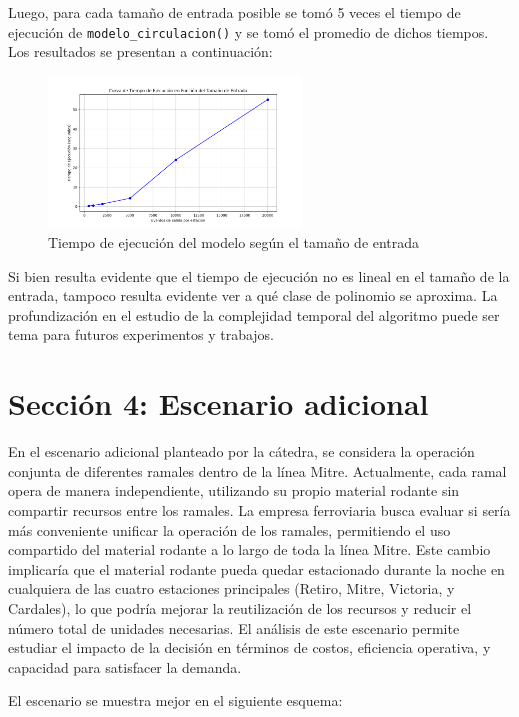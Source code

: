 \documentclass{article}
\begin{document}
Luego, para cada tamaño de entrada posible se tomó 5 veces el tiempo de ejecución de \texttt{modelo\_circulacion()} y se tomó el promedio de dichos tiempos. Los resultados se presentan a continuación:

\begin{figure}[H]
    \centering
    \includegraphics[width=0.6\textwidth]{exp5/tiempos.png}
    \caption{Tiempo de ejecución del modelo según el tamaño de entrada}
    \label{fig:ejemplo}
\end{figure}

Si bien resulta evidente que el tiempo de ejecución no es lineal en el tamaño de la entrada, tampoco resulta evidente ver a qué clase de polinomio se aproxima. La profundización en el estudio de la complejidad temporal del algoritmo puede ser tema para futuros experimentos y trabajos.

\section*{Sección 4: Escenario adicional}

En el escenario adicional planteado por la cátedra, se considera la operación conjunta de diferentes ramales dentro de la línea Mitre. Actualmente, cada ramal opera de manera independiente, utilizando su propio material rodante sin compartir recursos entre los ramales. La empresa ferroviaria busca evaluar si sería más conveniente unificar la operación de los ramales, permitiendo el uso compartido del material rodante a lo largo de toda la línea Mitre. Este cambio implicaría que el material rodante pueda quedar estacionado durante la noche en cualquiera de las cuatro estaciones principales (Retiro, Mitre, Victoria, y Cardales), lo que podría mejorar la reutilización de los recursos y reducir el número total de unidades necesarias. El análisis de este escenario permite estudiar el impacto de la decisión en términos de costos, eficiencia operativa, y capacidad para satisfacer la demanda. 

El escenario se muestra mejor en el siguiente esquema:
\end{document}
